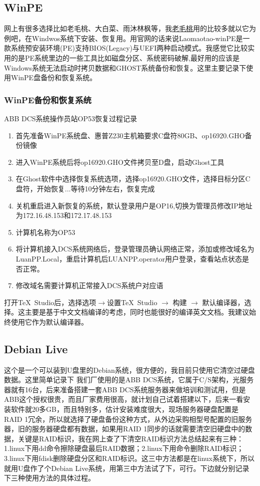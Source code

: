\subsection{WinPE}
网上有很多选择比如老毛桃、大白菜、雨沐林枫等，我\href{https://lmt.psydrj.com/index.html}{老毛桃}用的比较多就以它为例吧，在Windwos系统下安装、恢复用。用官网的话来说Laomaotao-winPE是一款系统预安装环境(PE)支持BIOS(Legacy)与UEFI两种启动模式。我感觉它比较实用的是PE系统里边的一些工具比如磁盘分区、系统密码破解,最好用的应该是Windows系统无法启动时拷贝数据和GHOST系统备份和恢复。这里主要记录下使用WinPE盘备份和恢复系统。
\subsubsection{WinPE备份和恢复系统}
ABB DCS系统操作员站OP53恢复过程记录
\begin{enumerate}
	\item 首先准备WinPE系统盘、惠普Z230主机箱要求C盘符80GB、op16920.GHO备份镜像
	\item 进入WinPE系统后将op16920.GHO文件拷贝至D盘，启动Ghost工具
	\item 在Ghost软件中选择恢复系统选项，选择op16920.GHO文件，选择目标分区C盘符，开始恢复...等待10分钟左右，恢复完成
	\item 关机重启进入新恢复的系统，默认登录用户是OP16,切换为管理员修改IP地址为172.16.48.153和172.17.48.153
	\item 计算机名称为OP53
	\item 将计算机接入DCS系统网络后，登录管理员确认网络正常，添加或修改域名为LuanPP.Local，重启计算机后LUANPP.operator用户登录，查看站点状态是否正常。
	\item 修改域名需要计算机正常接入DCS系统户对应语

\end{enumerate}

打开\TeX\ Studio后，选择选项$\rightarrow$设置\TeX\ Studio $\rightarrow$ 构建 $\rightarrow$ 默认编译器，选择\xelatex{}。这主要是基于中文文档编译的考虑，同时\xelatex 也能很好的编译英文文档。我建议始终使用它作为默认编译器。

\subsection{Debian Live}
这个是一个可以装到U盘里的Debian系统，很方便的，我目前只使用它清空过硬盘数据。这里简单记录下
我们厂使用的是ABB DCS系统，它属于C/S架构，光服务器就有16台，后来准备搭建一套ABB DCS系统服务器来做培训和测试用，但是ABB这个授权很贵，而且厂家费用很高，就计划自己试着搭建以下，后来一看安装软件就20多GB，而且特别多，估计安装难度很大，现场服务器硬盘配置是RAID 1冗余，所以就选择了硬盘备份这种方式，从外边采购相型号配置的旧服务器，旧的服务器硬盘都有数据，如果用RAID 1同步的话就需要清空旧硬盘中的数据，关键是RAID标识，我在网上查了下清空RAID标识方法总结起来有三种：1.linux下用dd命令擦除硬盘最后RAID数据；2.linux下用命令删除RAID标识；3.linux下用fdisk删除硬盘分区和RAID标识。这三中方法都是在linux系统下，所以就用U盘作了个Debian Live系统，用第三中方法试了下，可行。下边就分别记录下三种使用方法的具体过程。
